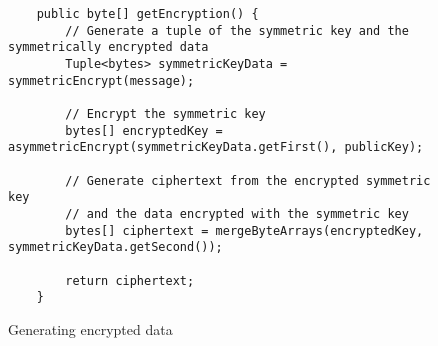 \begin{figure}[H]
  \centering
  \begin{verbatim}
	public byte[] getEncryption() {
		// Generate a tuple of the symmetric key and the symmetrically encrypted data
		Tuple<bytes> symmetricKeyData = symmetricEncrypt(message);

		// Encrypt the symmetric key
		bytes[] encryptedKey = asymmetricEncrypt(symmetricKeyData.getFirst(), publicKey);

		// Generate ciphertext from the encrypted symmetric key
		// and the data encrypted with the symmetric key
		bytes[] ciphertext = mergeByteArrays(encryptedKey, symmetricKeyData.getSecond());
        
		return ciphertext;
	}
  \end{verbatim}
  \caption{Generating encrypted data}
  \label{code:encrypt_data}
\end{figure}
